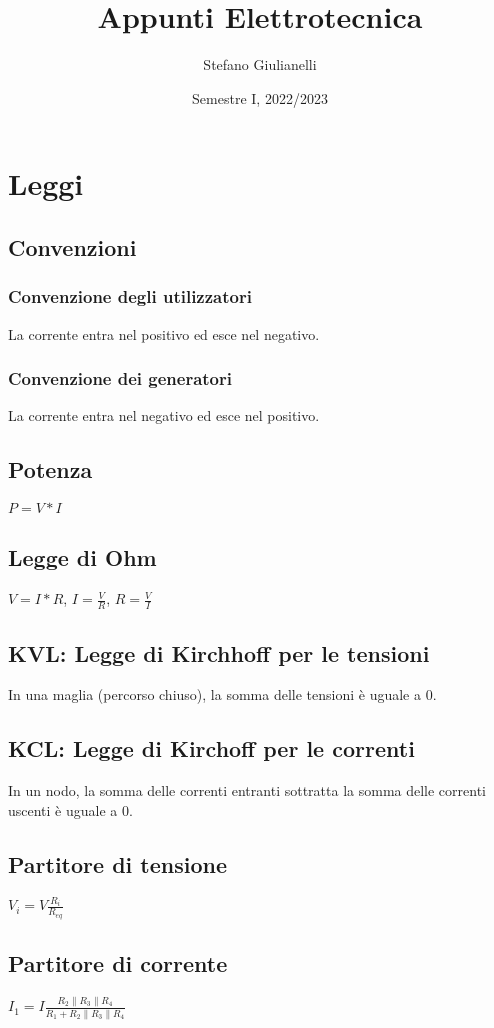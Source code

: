 \documentclass[12pt]{article}
\begin{document}
\author{Stefano Giulianelli}
\title{Appunti Elettrotecnica}
\date{Semestre I, 2022/2023}
\maketitle{}
\tableofcontents{}
\newpage
\section{Leggi}
\subsection{Convenzioni}
\subsubsection{Convenzione degli utilizzatori}
La corrente entra nel positivo ed esce nel negativo.
\subsubsection{Convenzione dei generatori}
La corrente entra nel negativo ed esce nel positivo.
\subsection{Potenza}
$P = V * I$
\subsection{Legge di Ohm}
$V = I*R$, $I = \frac{V}{R}$, $R =\frac{V}{I}$
\subsection{KVL: Legge di Kirchhoff per le tensioni}
In una maglia (percorso chiuso), la somma delle tensioni è uguale a 0.
\subsection{KCL: Legge di Kirchoff per le correnti}
In un nodo, la somma delle correnti entranti sottratta la somma delle correnti uscenti è uguale a 0.
\subsection{Partitore di tensione}
$V_i = V\frac{R_i}{R_{eq}}$
\subsection{Partitore di corrente}
$I_1 = I\frac{R_2\parallel R_3\parallel R_4}{R_1 + R_2\parallel R_3\parallel R_4}$
\end{document}
